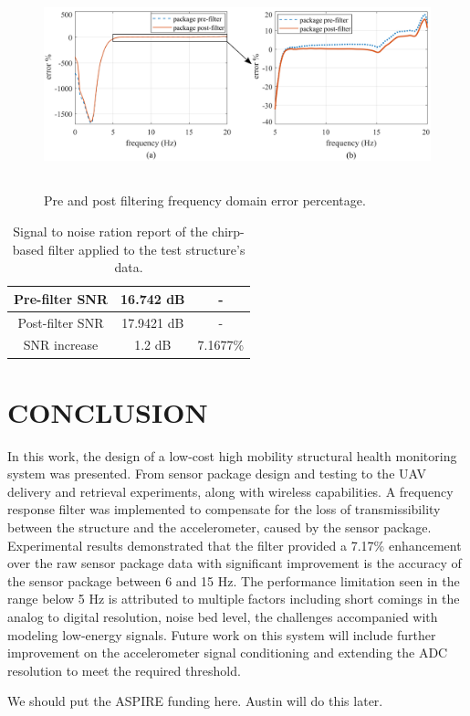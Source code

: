 \documentclass[]{spie}  %
\newcommand{\bl}[1]{\textcolor[rgb]{0.00,0.00,1.00}{#1}}
\begin{document}
	\begin{figure} [H]
		\centering
		\includegraphics[height=6cm]{figures/Chirp Structure Error.png}
		\caption{Pre and post filtering frequency domain error percentage.}
		\label{fig:chirp structure error} 	
	\end{figure} 

	\begin{table}[H]
	\caption{Signal to noise ration report of the chirp-based filter applied to the test structure’s data.} 
	\label{tab:SNR Report}
	\begin{center}       
		\begin{tabular}{|c|c|c|} 
			\hline
			\rule[-1ex]{0pt}{3.5ex}  Pre-filter SNR & 16.742 dB & - \\
			\hline
			\rule[-1ex]{0pt}{3.5ex}  Post-filter SNR & 17.9421 dB & - \\
			\hline
			\rule[-1ex]{0pt}{3.5ex}  SNR increase & 1.2 dB & 7.1677\% \\
			\hline
		\end{tabular}
	\end{center}
	\end{table}
	
	\section{CONCLUSION}
	In this work, the design of a low-cost high mobility structural health monitoring system was presented. From sensor package design and testing to the UAV delivery and retrieval experiments, along with wireless capabilities. A frequency response filter was implemented to compensate for the loss of transmissibility between the structure and the accelerometer, caused by the sensor package. Experimental results demonstrated that the filter provided a 7.17\% enhancement over the raw sensor package data with significant improvement is the accuracy of the sensor package between 6 and 15 Hz. The performance limitation seen in the range below 5 Hz is attributed to multiple factors including short comings in the analog to digital resolution, noise bed level, the challenges accompanied with modeling low-energy signals. Future work on this system will include further improvement on the accelerometer signal conditioning and extending the ADC resolution to meet the required threshold.  
	
	\acknowledgments %
	
	\bl{We should put the ASPIRE funding here. Austin will do this later.}

	
\end{document}
